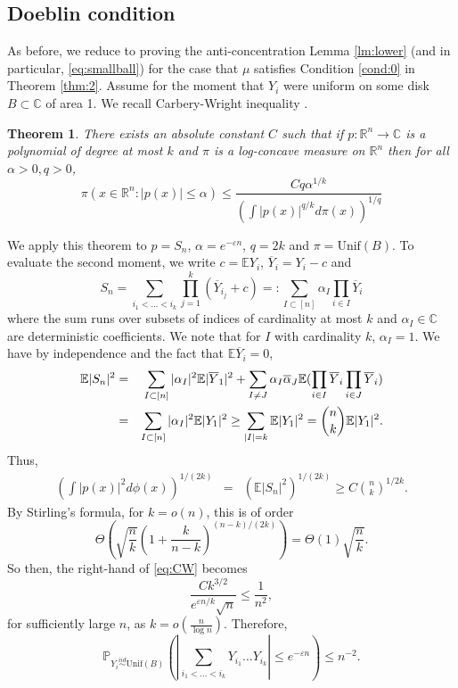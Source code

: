 \documentclass[12pt, reqno]{amsart}
\theoremstyle{plain}
\newtheorem{theorem}{Theorem}[section]
\theoremstyle{definition}
\newcommand\C{{\mathbb{C}}}
\newcommand\R{{\mathbb{R}}}
\renewcommand\P{{\mathbb{P}}}
\newcommand\E{{\mathbb{E}}}
\newcommand{\ep}{\varepsilon}
\begin{document}
 \subsection{Doeblin condition}
   As before, we reduce to proving the anti-concentration Lemma \ref{lm:lower} (and in particular, \eqref{eq:smallball}) for the case that $\mu$ satisfies Condition \eqref{cond:0} in Theorem \ref{thm:2}.  
 Assume for the moment that $Y_i$ were uniform on some disk $B\subset \C$ of area 1. We recall Carbery-Wright inequality \cite[Theorem 8]{carbery2001distributional}.
 \begin{theorem}
 	There exists an absolute constant $C$ such that if $p: \R^{n}\to \C$ is a polynomial of degree at most $k$ and $\pi$ is a log-concave measure on $\R^{n}$ then for all $\alpha>0, q>0$,
 	\begin{equation}\label{eq:CW}
 		\pi(x\in \R^{n}: |p(x)|\le \alpha)\le \frac{Cq\alpha^{1/k}}{\left (\int |p(x)|^{q/k}d\pi (x)\right )^{1/q}}
 	\end{equation}
 \end{theorem}
 We apply this theorem to $p=S_{n}$, $\alpha =e^{-\ep n}$, $q = 2k$ and $\pi=\text{Unif}(B)$. 
 To evaluate the second moment, we write $c = \E Y_i$, $\overline Y_i = Y_i - c$ and 
 $$S_n=\sum_{i_1<\dots<i_k} \prod_{j=1}^{k} (\overline Y_{i_j}+c)=:\sum_{I\subset [n]} \alpha_I\prod_{i\in I} \overline Y_i$$
 where the sum runs over subsets of indices of cardinality at most $k$ and $\alpha_I\in \C$ are deterministic coefficients. We note that for $I$ with cardinality $k$, $\alpha_I = 1$.
 We have by independence and the fact that $\E \overline Y_i = 0$, 
 \begin{eqnarray*}
 	\E |S_n|^2 &=& \sum_{I\subset [n]} |\alpha_I|^{2} \E |\overline Y_1|^{2} + \sum_{I\neq J} \alpha_I \overline \alpha_J \E (\prod_{i\in I} \overline Y_i \prod_{i\in J} \overline Y_i) \notag\\
 	&=& \sum_{I\subset [n]} |\alpha_I|^{2} \E |Y_1|^{2} \ge \sum_{|I| = k}  \E |Y_1|^{2} = {n\choose k} \E |Y_1|^2.
 \end{eqnarray*}
 Thus, 
 \begin{eqnarray*}
 	\left (\int |p(x)|^{2}d\phi (x)\right )^{1/(2k)}&=& \left (\E |S_n|^{2}\right )^{1/(2k)}	\ge   C {n \choose k}^{1/2k}.
 \end{eqnarray*}
 By Stirling's formula, for $k = o(n)$, this is of order 
 $$\Theta\left (\sqrt {\frac{n}{k}} \left (1 + \frac{k}{n-k}\right )^{(n-k)/(2k)}\right ) = \Theta(1)\sqrt{\frac{n}{k}}.$$
 So then, the right-hand of \eqref{eq:CW} becomes
 $$\frac{Ck^{3/2}}{e^{\ep n/k}\sqrt n}\le \frac{1}{n^2},$$
 for sufficiently large $n$, as $k=o( \frac{n}{\log n})$. Therefore, 
 $$\P_{Y_i\overset{iid}{\sim} \text{Unif}(B)}\left ( \left |\sum_{i_1<\dots<i_k} Y_{i_1}\dots Y_{i_k}\right | \le  e^{-\ep n}\right )\le n^{-2}.$$
 
\end{document}

